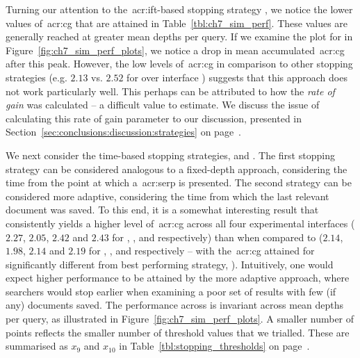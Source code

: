 Turning our attention to the~\gls{acr:ift}-based stopping strategy , we notice the lower values of~\gls{acr:cg} that are attained in Table~\ref{tbl:ch7_sim_perf}. These values are generally reached at greater mean depths per query. If we examine the plot for  in Figure~\ref{fig:ch7_sim_perf_plots}, we notice a drop in mean accumulated~\gls{acr:cg} after this peak. However, the low levels of~\gls{acr:cg} in comparison to other stopping strategies (e.g. $2.13$ vs. $2.52$ for  over interface ) suggests that this approach does not work particularly well. This perhaps can be attributed to how the \emph{rate of gain} was calculated -- a difficult value to estimate. We discuss the issue of calculating this rate of gain parameter to our discussion, presented in Section~\ref{sec:conclusions:discussion:strategies} on page~\pageref{sec:conclusions:discussion:strategies}.

We next consider the time-based stopping strategies,  and . The first stopping strategy can be considered analogous to a fixed-depth approach, considering the time from the point at which a~\gls{acr:serp} is presented. The second strategy can be considered more adaptive, considering the time from which the last relevant document was saved. To this end, it is a somewhat interesting result that  consistently yields a higher level of~\gls{acr:cg} across all four experimental interfaces ($2.27$, $2.05$, $2.42$ and $2.43$ for , ,  and  respectively) than when compared to  ($2.14$, $1.98$, $2.14$ and $2.19$ for , ,  and  respectively -- with the~\gls{acr:cg} attained for  significantly different from best performing strategy, ). Intuitively, one would expect higher performance to be attained by the more adaptive approach, where searchers would stop earlier when examining a poor set of results with few (if any) documents saved. The performance across  is invariant across mean depths per query, as illustrated in Figure~\ref{fig:ch7_sim_perf_plots}. A smaller number of points reflects the smaller number of threshold values that we trialled. These are summarised as $x_9$ and $x_{10}$ in Table~\ref{tbl:stopping_thresholds} on page~\pageref{tbl:stopping_thresholds}.

